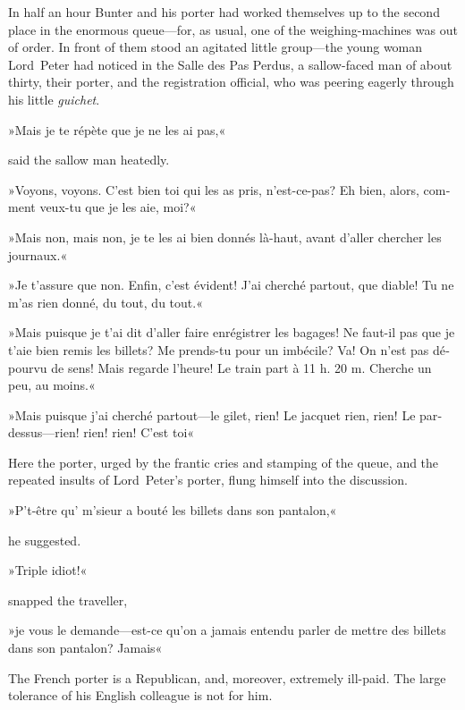 In half an hour Bunter and his porter had worked themselves up to the second place in the enormous queue—for, as usual, one of the weighing-machines was out of order. In front of them stood an agitated little group—the young woman Lord~Peter had noticed in the Salle des Pas Perdus, a sallow-faced man of about thirty, their porter, and the registration official, who was peering eagerly through his little \textit{guichet}.

\begin{french}»Mais je te répète que je ne les ai pas,« \end{french} said the sallow man heatedly. \begin{french}»Voyons, voyons. C'est bien toi qui les as pris, n'est-ce-pas? Eh bien, alors, comment veux-tu que je les aie, moi?«

»Mais non, mais non, je te les ai bien donnés là-haut, avant d'aller chercher les journaux.«

»Je t'assure que non. Enfin, c'est évident! J'ai cherché partout, que diable! Tu ne m'as rien donné, du tout, du tout.«

»Mais puisque je t'ai dit d'aller faire enrégistrer les bagages! Ne faut-il pas que je t'aie bien remis les billets? Me prends-tu pour un imbécile? Va! On n'est pas dépourvu de sens! Mais regarde l'heure! Le train part à 11 h. 20 m. Cherche un peu, au moins.«

»Mais puisque j'ai cherché partout—le gilet, rien! Le jacquet rien, rien! Le pardessus—rien! rien! rien! C'est toi\longdash«
\end{french}

Here the porter, urged by the frantic cries and stamping of the queue, and the repeated insults of Lord~Peter's porter, flung himself into the discussion.
\begin{french}»P't-être qu' m'sieur a bouté les billets dans son pantalon,«\end{french} he suggested.

\begin{french}»Triple idiot!«\end{french} snapped the traveller, \begin{french}»je vous le demande—est-ce qu'on a jamais entendu parler de mettre des billets dans son pantalon? Jamais\longdash«\end{french}

The French porter is a Republican, and, moreover, extremely ill-paid. The large tolerance of his English colleague is not for him.

